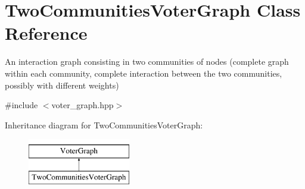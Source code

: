 \hypertarget{class_two_communities_voter_graph}{\section{Two\-Communities\-Voter\-Graph Class Reference}
\label{class_two_communities_voter_graph}
}


An interaction graph consisting in two communities of nodes (complete graph within each community, complete interaction between the two communities, possibly with different weights)  




{\ttfamily \#include $<$voter\-\_\-graph.\-hpp$>$}

Inheritance diagram for Two\-Communities\-Voter\-Graph\-:\begin{figure}[H]
\begin{center}
\leavevmode
\includegraphics[height=2.000000cm]{class_two_communities_voter_graph}
\end{center}
\end{figure}
